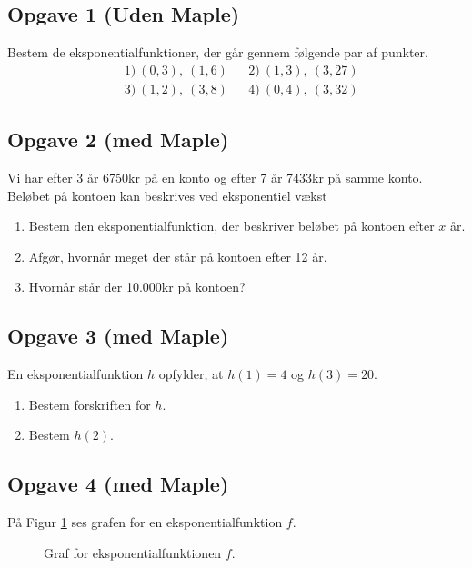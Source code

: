 \subsection*{Opgave 1 (Uden Maple)}
Bestem de eksponentialfunktioner, der går gennem følgende par af punkter.
\begin{align*}
&1) \ (0,3), \ (1,6)  &&2) \ (1,3), \ (3,27)      \\
&3) \ (1,2), \  (3,8)   &&4) \  (0,4), \ (3,32)    
\end{align*}

\subsection*{Opgave 2 (med Maple)}
Vi har efter 3 år 6750kr på en konto og efter 7 år 7433kr på samme konto. Beløbet på kontoen kan beskrives ved eksponentiel vækst
\begin{enumerate}[label=\roman*)]
	\item Bestem den eksponentialfunktion, der beskriver beløbet på kontoen efter $x$ år.
	\item Afgør, hvornår meget der står på kontoen efter 12 år.
	\item Hvornår står der 10.000kr på kontoen?
\end{enumerate}

\subsection*{Opgave 3 (med Maple)}

En eksponentialfunktion $h$ opfylder, at $h(1) = 4$ og $h(3)  = 20$. 
\begin{enumerate}[label = \roman*)]
	\item Bestem forskriften for $h$.
	\item Bestem $h(2)$.
\end{enumerate}

\subsection*{Opgave 4 (med Maple)}
På Figur \ref{fig:graf} ses grafen for en eksponentialfunktion $f$.
\begin{figure}[H]
	\centering
	\caption{Graf for eksponentialfunktionen $f$.}
	\label{fig:graf}
\end{figure}

